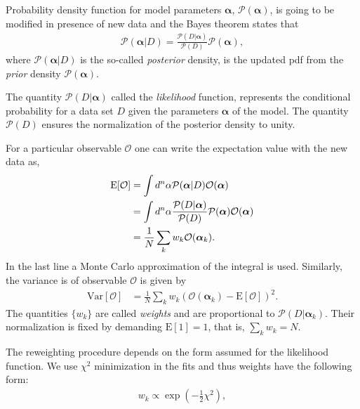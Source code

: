 \documentclass[twocolumn,showpacs,preprintnumbers,amsmath,amssymb,floatfix,prd]{revtex4}
\begin{document}
Probability density function for model parameters $\bm{\alpha}$, $\mathcal{P}(\bm{\alpha})$, is going to be modified in presence of new data and the Bayes theorem states that 
%
\begin{align}
\mathcal{P}(\bm{\alpha}|D)
=\frac{\mathcal{P}(D|\bm{\alpha})}{\mathcal{P}(D)} \mathcal{P}(\bm{\alpha}),
\label{eq:bayes}
\end{align}
%
where $\mathcal{P}(\bm{\alpha}|D)$ is the so-called \emph{posterior} density, 
is the updated pdf from the \emph{prior} density 
$\mathcal{P}(\bm{\alpha})$.
 
The quantity $\mathcal{P}(D|\bm{\alpha})$ called the \emph{likelihood} 
function,
represents the conditional probability for a data set $D$ given the
parameters $\bm{\alpha}$ of the model.
The quantity $\mathcal{P}(D) $ ensures the normalization of the 
posterior density to unity.  

For a particular observable $\mathcal{O}$ one can write the expectation value 
with the new data as,
%
\begin{align}
\text{E}[\mathcal{O}]
&=	\int d^n\alpha \mathcal{P}(\bm{\alpha}|D)
	\mathcal{O}(\bm{\alpha})\notag\\
&=	\int d^n\alpha \frac{\mathcal{P}(D|\bm{\alpha})}{\mathcal{P}(D)} 
	\mathcal{P}(\bm{\alpha})\mathcal{O}(\bm{\alpha})\notag\\
&=	\frac{1}{N} \sum_k w_k \mathcal{O}(\bm{\alpha}_k).
\label{eq:E}
\end{align}
%
In the last line  a Monte Carlo approximation of the integral is used.
Similarly, the variance is of observable $\mathcal{O}$ is given by
%
\begin{align}
\text{Var}[\mathcal{O}]
&=\frac{1}{N} \sum_k w_k (\mathcal{O}(\bm{\alpha}_k)-\text{E}
[\mathcal{O}])^2 .
\label{eq:Var}
\end{align}
%
The quantities $\{w_k\}$ are called \emph{weights} and are proportional to 
$\mathcal{P}(D|\bm{\alpha}_k)$. 
Their normalization is fixed by demanding $\text{E}[1]=1$, that is,  
$\sum_k w_k=N$.

The reweighting procedure depends on the form assumed for the likelihood 
function. We use $\chi^2$ minimization in the fits and thus weights have the following form:
\begin{align}
	w_k \propto \exp\left(-\frac{1}{2}\chi^2\right),
\label{eq:bayes1}
\end{align}

\end{document}
